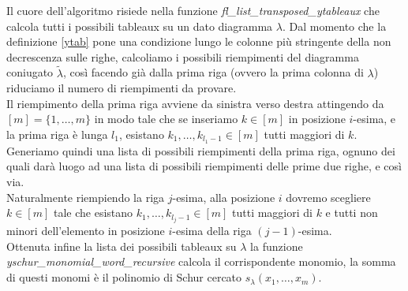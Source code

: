 Il cuore dell'algoritmo risiede nella funzione
\emph{fl\_list\_transposed\_ytableaux} che calcola tutti i
possibili tableaux su un dato diagramma $\lambda$. Dal momento che la
definizione \eqref{ytab} pone una condizione
lungo le colonne pi\`u stringente della non decrescenza sulle
righe, calcoliamo i possibili riempimenti del diagramma coniugato
$\tilde{\lambda}$, cos\`i facendo gi\`a dalla prima riga (ovvero la
prima colonna di $\lambda$) riduciamo il numero di riempimenti da
provare.\\
Il riempimento della prima riga avviene da sinistra verso destra
attingendo da $[m]=\{1,\ldots, m\}$ in modo tale che se inseriamo $k \in
[m]$ in posizione $i$-esima, e la prima riga \`e lunga $l_1$, esistano
$k_1,\ldots,k_{l_1-1} \in [m]$ tutti maggiori di $k$. Generiamo quindi
una lista di possibili riempimenti della prima riga, ognuno dei quali
dar\`a luogo ad una lista di possibili riempimenti delle prime due
righe, e cos\`i via.\\ 
Naturalmente riempiendo la riga $j$-esima, alla
posizione $i$ dovremo scegliere $k \in [m]$ tale che esistano
$k_1,\ldots,k_{l_j-1} \in [m]$ tutti maggiori di $k$ e tutti non
minori dell'elemento in posizione $i$-esima della riga
$(j-1)$-esima.\\
Ottenuta infine la lista dei possibili tableaux su $\lambda$ la
funzione \emph{yschur\_monomial\_word\_recursive} calcola il
corrispondente monomio, la somma di questi monomi \`e il polinomio di
Schur cercato $s_\lambda(x_1,\ldots,x_m)$.


